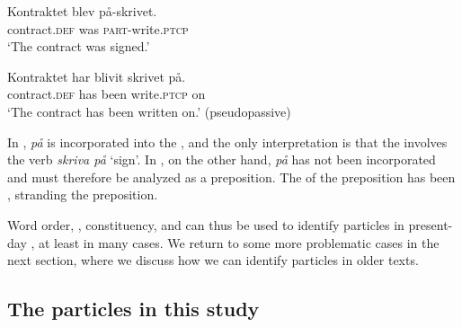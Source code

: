 \documentclass[output=paper]{langscibook}
\begin{document}
\ea\label{ex:lalu:14}
\ea\label{ex:lalu:14a}
\gll  Kontraktet   blev   på-skrivet.\\
    contract\textsc{.def}   was   \textsc{part-}write.\textsc{ptcp}\\
\glt `The contract was signed.'

\ex\label{ex:lalu:14b}
\gll  Kontraktet     har   blivit   skrivet     på. \\
    contract\textsc{.def}   has   been   write.\textsc{ptcp}   on\\
\glt `The contract has been written on.’ (pseudopassive)\\
\z
\z


In , \textit{på} is incorporated into the  , and the only interpretation is that the  involves the  verb \textit{skriva på} ‘sign’. In , on the other hand, \textit{på} has not been incorporated and must therefore be analyzed as a  preposition. The  of the preposition has been , stranding the preposition.



Word order, , constituency, and  can thus be used to identify particles in present-day , at least in many cases. We return to some more problematic cases in the next section, where we discuss how we can identify particles in older  texts. 


\subsection{The particles in this study}\label{sec:lalu:2.3}
\end{document}
